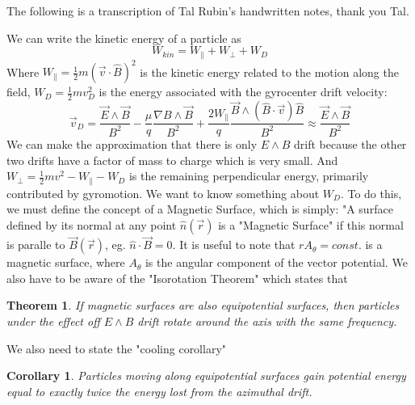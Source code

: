\documentclass[12pt]{article}
\newtheorem{theorem}{Theorem}
\newtheorem{corollary}{Corollary}
\begin{document}
The following is a transcription of Tal Rubin's handwritten notes, thank you Tal.

We can write the kinetic energy of a particle as
\begin{equation}\label{basickinen}
W_{kin}=W_{\parallel}+W_{\perp}+W_D
\end{equation}
Where $W_{\parallel}=\frac{1}{2}m(\vec{v}\cdot\hat{B})^2$ is the kinetic energy related to the motion along the field, $W_D=\frac{1}{2}mv^2_D$ is the energy associated with the gyrocenter drift velocity:
\begin{equation}\label{driftvel}
\vec{v}_D=\frac{\vec{E}\wedge\vec{B}}{B^2}-\frac{\mu}{q}\frac{\nabla B\wedge\vec{B}}{B^2}+\frac{2W_{\parallel}}{q}\frac{\vec{B}\wedge(\hat{B}\cdot\vec{v})\hat{B}}{B^2}\approx\frac{\vec{E}\wedge\vec{B}}{B^2}
\end{equation}
We can make the approximation that there is only $E\wedge B$ drift because the other two drifts have a factor of mass to charge which is very small. And $W_{\perp}=\frac{1}{2}mv^2-W_{\parallel}-W_D$ is the remaining perpendicular energy, primarily contributed by gyromotion. We want to know something about $W_D$. To do this, we must define the concept of a Magnetic Surface, which is simply: "A surface defined by its normal at any point $\hat{n}(\vec{r})$ is a "Magnetic Surface" if this normal is paralle to $\vec{B}(\vec{r})$, eg. $\hat{n}\cdot\vec{B}=0$. It is useful to note that $rA_{\theta}=const.$ is a magnetic surface, where $A_{\theta}$ is the angular component of the vector potential. We also have to be aware of the "Isorotation Theorem" which states that 
\begin{theorem}
If magnetic surfaces are also equipotential surfaces, then particles under the effect off $E\wedge B$ drift rotate around the axis with the same frequency.
\end{theorem}
We also need to state the "cooling corollary"
\begin{corollary}
Particles moving along equipotential surfaces gain potential energy equal to exactly twice the energy lost from the azimuthal drift. 
\end{corollary} 
\end{document}
